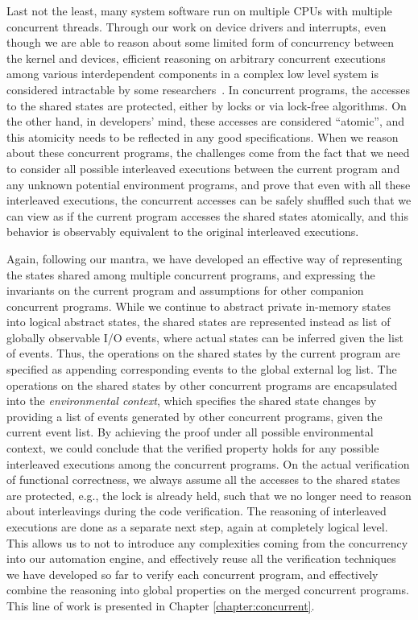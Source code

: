 Last not the least, many system software run on multiple CPUs with
multiple concurrent threads.   
Through our work on device drivers and interrupts, even though
we are able to reason about some limited form of concurrency between the kernel and
devices, efficient reasoning on arbitrary concurrent executions among various
interdependent components in a complex low level system is considered
intractable by some researchers~\cite{vontessin13,peters15}. 
In concurrent programs, the accesses to the shared states are protected, either by
locks or via lock-free algorithms. On the other hand, in developers' mind, these accesses
are considered ``atomic'', and this atomicity needs to be reflected in any good specifications.
When we reason about these concurrent programs, the challenges come from the fact
that we need to consider all possible interleaved executions between the current program
and any unknown potential environment programs, and prove that even with all these interleaved
executions, the concurrent accesses can be safely shuffled such that we can view as if
the current program accesses the shared states atomically, and this behavior is observably
equivalent to the original interleaved executions.

Again, following our mantra, we have developed an effective way of representing the states
shared among multiple concurrent programs, and expressing the invariants on the current program
and assumptions for other companion concurrent programs. While we continue to abstract private in-memory
states into logical abstract states, the shared states are represented instead as list of globally
observable I/O events, where actual states can be inferred given the list of events. Thus, the operations
on the shared states by the current program are specified as appending corresponding events to the
global external log list. The operations on the shared states by other concurrent programs are encapsulated
into the {\it environmental context}, which specifies the shared state changes by providing a list of events
generated by other concurrent programs, given the current event list.
By achieving the proof under all possible environmental context, we could conclude that
the verified property holds for any possible interleaved executions among the concurrent programs.
On the actual verification of functional correctness, we always assume all the accesses to the shared
states are protected, e.g., the lock is already held, such that we no longer need to reason about interleavings
during the code verification. The reasoning of interleaved executions are done as a separate next step,
again at completely logical level.
This allows us to not to introduce any complexities coming from the concurrency into our automation engine,
and effectively reuse all the
verification techniques we have developed so far to verify each concurrent program, and effectively
combine the reasoning into global properties on the merged concurrent programs.
This line of work is presented in Chapter \ref{chapter:concurrent}.

